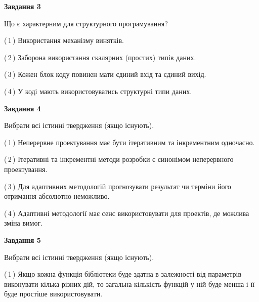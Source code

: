 \documentclass[10pt, ukrainian]{article}
\begin{document}
{\begin {large}
{\begin {center}\textbf{Завдання 3}\end {center}}\par
Що є характерним для структурного програмування?\par
\vspace{2mm}



(\,1\,) Використання механізму винятків. %



(\,2\,) Заборона використання скалярних (простих) типів даних. %



(\,3\,) Кожен блок коду повинен мати єдиний вхід та єдиний вихід.%



(\,4\,) У коді мають використовуватись структурні типи даних. %


{\begin {center}\textbf{Завдання 4}\end {center}}\par
Вибрати всі істинні твердження (якщо існують).\par
\vspace{2mm}



(\,1\,) Неперервне проектування має бути ітеративним та інкрементним одночасно. %



(\,2\,) Ітеративні та інкрементні методи розробки є синонімом неперервного проектування. %



(\,3\,) Для адаптивних методологій прогнозувати результат чи терміни його отримання абсолютно неможливо. %



(\,4\,) Адаптивні методології має сенс використовувати для проектів, де можлива зміна вимог. %


{\begin {center}\textbf{Завдання 5}\end {center}}\par
Вибрати всі істинні твердження (якщо існують).\par
\vspace{2mm}



(\,1\,) Якщо кожна функція бібліотеки буде здатна в залежності від параметрів виконувати кілька різних дій, то загальна кількість функцій у ній буде менша і її буде простіше використовувати. %




\end{large}}
\end{document}
